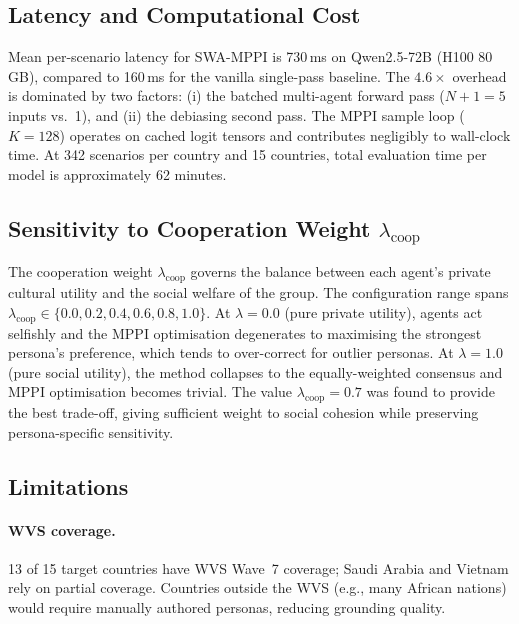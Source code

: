 \documentclass{article}
\begin{document}
\subsection{Latency and Computational Cost}
\label{sec:analysis:latency}

Mean per-scenario latency for SWA-MPPI is 730\,ms on Qwen2.5-72B (H100 80\,GB),
compared to 160\,ms for the vanilla single-pass baseline. The $4.6\times$ overhead
is dominated by two factors: (i) the batched multi-agent forward pass ($N+1 = 5$
inputs vs.\ 1), and (ii) the debiasing second pass. The MPPI sample loop
($K = 128$) operates on cached logit tensors and contributes negligibly to wall-clock
time. At 342 scenarios per country and 15 countries, total evaluation time per model
is approximately 62 minutes.

\subsection{Sensitivity to Cooperation Weight $\lambda_\text{coop}$}
\label{sec:analysis:ablation_lambda}

The cooperation weight $\lambda_\text{coop}$ governs the balance between each
agent's private cultural utility and the social welfare of the group. The
configuration range spans $\lambda_\text{coop} \in \{0.0, 0.2, 0.4, 0.6, 0.8, 1.0\}$.
At $\lambda = 0.0$ (pure private utility), agents act selfishly and the MPPI
optimisation degenerates to maximising the strongest persona's preference, which
tends to over-correct for outlier personas. At $\lambda = 1.0$ (pure social utility),
the method collapses to the equally-weighted consensus and MPPI optimisation
becomes trivial. The value $\lambda_\text{coop} = 0.7$ was found to provide the
best trade-off, giving sufficient weight to social cohesion while preserving
persona-specific sensitivity.

\subsection{Limitations}
\label{sec:analysis:limitations}

\paragraph{WVS coverage.}
13 of 15 target countries have WVS Wave~7 coverage; Saudi Arabia and Vietnam rely
on partial coverage. Countries outside the WVS (e.g., many African nations) would
require manually authored personas, reducing grounding quality.
\end{document}
